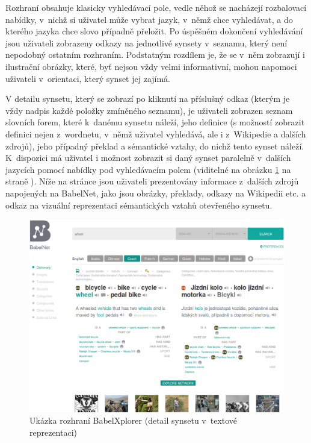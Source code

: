 \documentclass[a4paper,11pt,openany,twoside]{book}
\begin{document}
					Rozhraní obsahuje klasicky vyhledávací pole, vedle něhož se nacházejí rozbalovací nabídky, v~nichž si uživatel může vybrat jazyk, v~němž chce vyhledávat, a do kterého jazyka chce slovo případně přeložit. Po úspěšném dokončení vyhledávání jsou uživateli zobrazeny odkazy na jednotlivé synsety v~seznamu, který není nepodobný ostatním rozhraním. Podstatným rozdílem je, že se v~něm zobrazují i ilustrační obrázky, které, byť nejsou vždy velmi informativní, mohou napomoci uživateli v~orientaci, který synset jej zajímá. 

					V detailu synsetu, který se zobrazí po kliknutí na příslušný odkaz (kterým je vždy nadpis každé položky zmíněného seznamu), je uživateli zobrazen seznam slovních forem, které k~danému synsetu náleží, jeho definice (s možností zobrazit definici nejen z~wordnetu, v~němž uživatel vyhledává, ale i z~Wikipedie a dalších zdrojů), jeho případný překlad a sémantické vztahy, do nichž tento synset náleží. K~dispozici má uživatel i možnost zobrazit si daný synset paralelně v~dalších jazycích pomocí nabídky pod vyhledávacím polem (viditelné na obrázku \ref{fig:babelxplorer} na straně \pageref{fig:babelxplorer}). Níže na stránce jsou uživateli prezentovány informace z~dalších zdrojů napojených na BabelNet, jako jsou obrázky, překlady, odkazy na Wikipedii etc. a odkaz na vizuální reprezentaci sémantických vztahů otevřeného synsetu. 

					\begin{figure}[h]
						\centering
						\includegraphics[width=1.0\textwidth]{babelxplorer.png}
						\caption{Ukázka rozhraní BabelXplorer (detail synsetu v~textové reprezentaci)}
						\label{fig:babelxplorer}
					\end{figure}
\end{document}
